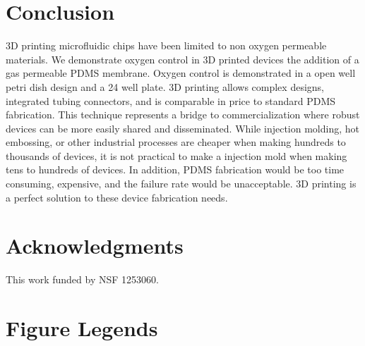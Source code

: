 \section*{Conclusion}
3D printing microfluidic chips have been limited to non oxygen permeable materials.
We demonstrate oxygen control in 3D printed devices the addition of a gas permeable PDMS membrane. 
Oxygen control is demonstrated in a open well petri dish design and a 24 well plate.
3D printing allows complex designs, integrated tubing connectors, and is comparable in price to standard PDMS fabrication.
This technique represents a bridge to commercialization where robust devices can be more easily shared and disseminated.
While injection molding, hot embossing, or other industrial processes are cheaper when making hundreds to thousands of devices, it is not practical to make a injection mold when making tens to hundreds of devices.
In addition, PDMS fabrication would be too time consuming, expensive, and the failure rate would be unacceptable.
3D printing is a perfect solution to these device fabrication needs.



\section*{Acknowledgments}

This work funded by NSF 1253060.





%
%
% 

\section*{Figure Legends}
%

